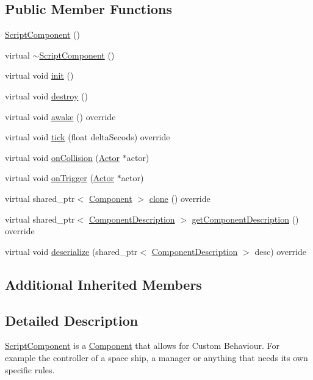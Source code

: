 \subsection*{Public Member Functions}
\begin{DoxyCompactItemize}
\item 
\hyperlink{class_script_component_a918a8a3ffb5ee72ead98eb693c343620}{Script\+Component} ()
\item 
virtual \hyperlink{class_script_component_a6c266c364bf21d0dddb6d7639500a077}{$\sim$\+Script\+Component} ()
\item 
virtual void \hyperlink{class_script_component_a6fb8a859ed628b7b97801a2b3fb4f8ea}{init} ()
\item 
virtual void \hyperlink{class_script_component_a3e7c2770a1ee8bcc1fd8d39fdb65cc44}{destroy} ()
\item 
virtual void \hyperlink{class_script_component_a4667b8a3712e18b25cd6f49f12c5677d}{awake} () override
\item 
virtual void \hyperlink{class_script_component_aa765fa62a343a8d83eb168d369b93a51}{tick} (float delta\+Secods) override
\item 
virtual void \hyperlink{class_script_component_a9f84fa4e6c97f6b61926164c487fd6af}{on\+Collision} (\hyperlink{class_actor}{Actor} $\ast$actor)
\item 
virtual void \hyperlink{class_script_component_a4632d59065aa53982b6b154d3bc60502}{on\+Trigger} (\hyperlink{class_actor}{Actor} $\ast$actor)
\item 
virtual shared\+\_\+ptr$<$ \hyperlink{class_component}{Component} $>$ \hyperlink{class_script_component_adebdf5187e8f41f68f445ff7555d5036}{clone} () override
\item 
virtual shared\+\_\+ptr$<$ \hyperlink{class_component_description}{Component\+Description} $>$ \hyperlink{group__serialization__functions_ga109d36ec69582f38228ec003039c653a}{get\+Component\+Description} () override
\item 
virtual void \hyperlink{group__serialization__functions_ga0fc188eda2331400a0bc2b5ecfd8221e}{deserialize} (shared\+\_\+ptr$<$ \hyperlink{class_component_description}{Component\+Description} $>$ desc) override
\end{DoxyCompactItemize}
\subsection*{Additional Inherited Members}


\subsection{Detailed Description}
\hyperlink{class_script_component}{Script\+Component} is a \hyperlink{class_component}{Component} that allows for Custom Behaviour. For example the controller of a space ship, a manager or anything that needs its own specific rules. 

